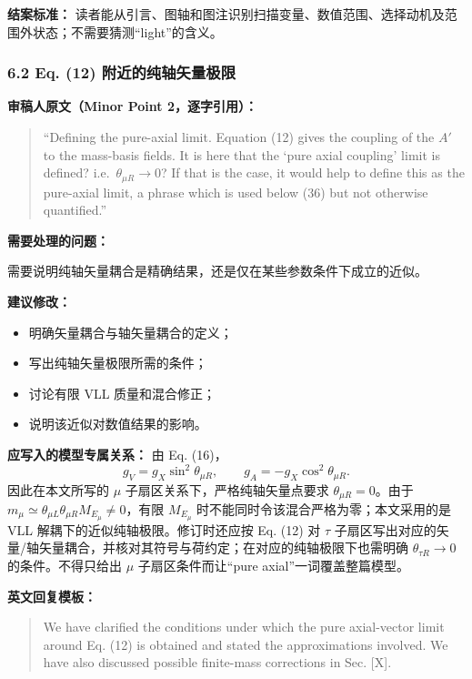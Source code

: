 \documentclass[
  chinese,
  UTF8]{ctexart}
\providecommand{\tightlist}{%
  \setlength{\itemsep}{0pt}\setlength{\parskip}{0pt}}
\begin{document}
\textbf{结案标准：}
读者能从引言、图轴和图注识别扫描变量、数值范围、选择动机及范围外状态；不需要猜测``light''的含义。

\subsubsection{6.2 Eq. (12)
附近的纯轴矢量极限}\label{eq.-12-ux9644ux8fd1ux7684ux7eafux8f74ux77e2ux91cfux6781ux9650}

\textbf{审稿人原文（Minor Point 2，逐字引用）：}

\begin{quote}
``Defining the pure-axial limit. Equation (12) gives the coupling of the
\(A'\) to the mass-basis fields. It is here that the `pure axial
coupling' limit is defined? i.e.~\(\theta_{\mu R}\to0\)? If that is the
case, it would help to define this as the pure-axial limit, a phrase
which is used below (36) but not otherwise quantified.''
\end{quote}

\textbf{需要处理的问题：}

需要说明纯轴矢量耦合是精确结果，还是仅在某些参数条件下成立的近似。

\textbf{建议修改：}

\begin{itemize}
\tightlist
\item
  明确矢量耦合与轴矢量耦合的定义；
\item
  写出纯轴矢量极限所需的条件；
\item
  讨论有限 VLL 质量和混合修正；
\item
  说明该近似对数值结果的影响。
\end{itemize}

\textbf{应写入的模型专属关系：} 由 Eq. (16)， \[
g_V=g_X\sin^2\theta_{\mu R},\qquad g_A=-g_X\cos^2\theta_{\mu R}.
\] 因此在本文所写的 \ensuremath{\mu} 子扇区关系下，严格纯轴矢量点要求
\(\theta_{\mu R}=0\)。由于
\(m_\mu\simeq\theta_{\mu L}\theta_{\mu R}M_{E_\mu}\neq0\)，有限
\(M_{E_\mu}\) 时不能同时令该混合严格为零；本文采用的是 VLL
解耦下的近似纯轴极限。修订时还应按 Eq. (12) 对 \ensuremath{\tau}
子扇区写出对应的矢量/轴矢量耦合，并核对其符号与荷约定；在对应的纯轴极限下也需明确
\(\theta_{\tau R}\to0\) 的条件。不得只给出 \ensuremath{\mu}
子扇区条件而让``pure axial''一词覆盖整篇模型。

\textbf{英文回复模板：}

\begin{quote}
We have clarified the conditions under which the pure axial-vector limit
around Eq. (12) is obtained and stated the approximations involved. We
have also discussed possible finite-mass corrections in Sec. {[}X{]}.
\end{quote}
\end{document}
